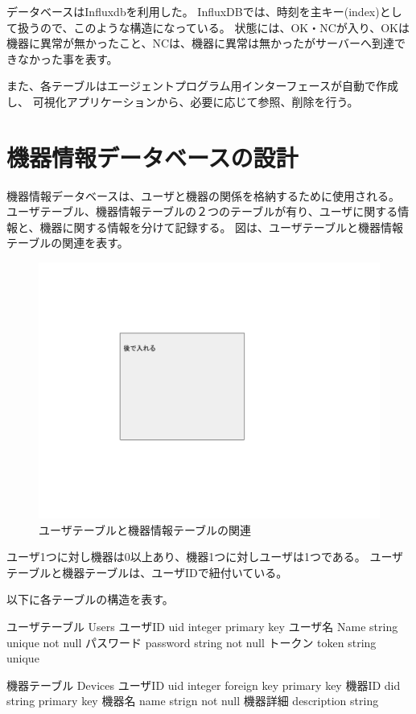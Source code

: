 データベースはInfluxdbを利用した。
InfluxDBでは、時刻を主キー(index)として扱うので、このような構造になっている。
状態には、OK・NCが入り、OKは機器に異常が無かったこと、NCは、機器に異常は無かったがサーバーへ到達できなかった事を表す。

また、各テーブルはエージェントプログラム用インターフェースが自動で作成し、
可視化アプリケーションから、必要に応じて参照、削除を行う。

\section{機器情報データベースの設計}
機器情報データベースは、ユーザと機器の関係を格納するために使用される。
ユーザテーブル、機器情報テーブルの２つのテーブルが有り、ユーザに関する情報と、機器に関する情報を分けて記録する。
図は、ユーザテーブルと機器情報テーブルの関連を表す。
\begin{figure}[htbp]
\includegraphics[width=16cm]{images/test.png}
\caption{ユーザテーブルと機器情報テーブルの関連}
\label{fig:erdiagram}
\end{figure}
ユーザ1つに対し機器は0以上あり、機器1つに対しユーザは1つである。
ユーザテーブルと機器テーブルは、ユーザIDで紐付いている。

以下に各テーブルの構造を表す。

ユーザテーブル Users
ユーザID uid integer primary key
ユーザ名 Name string unique not null
パスワード password string not null
トークン token string unique

機器テーブル Devices
ユーザID uid integer foreign key primary key
機器ID did string primary key
機器名 name strign not null
機器詳細 description string

